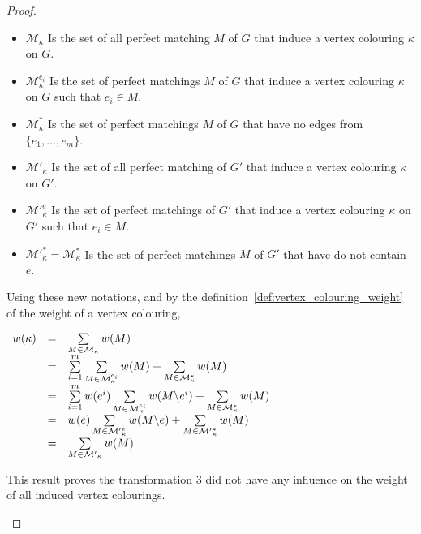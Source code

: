 \begin{proof}
\begin{enumerate}
            \begin{itemize}
                \item $\mathcal{M}_\kappa$ Is the set of all perfect matching $M$ of $G$ that induce a vertex colouring $\kappa$ on $G$.
                \item $\mathcal{M}_\kappa^{e_i}$ Is the set of perfect matchings $M$ of $G$ that induce a vertex colouring $\kappa$ on $G$ such that $e_i \in M$.
                \item $\mathcal{M}_\kappa^{*}$ Is the set of perfect matchings $M$ of $G$ that have no edges from $\{e_1, \dots, e_m\}$.
                \item $\mathcal{M'}_\kappa$ Is the set of all perfect matching of $G'$ that induce a vertex colouring $\kappa$ on $G'$.
                \item $\mathcal{M'}_\kappa^{e}$ Is the set of perfect matchings of $G'$ that induce a vertex colouring $\kappa$ on $G'$ such that $e_i \in M$.
                \item $\mathcal{M'}_\kappa^{*} = \mathcal{M}_\kappa^{*}$ Is the set of perfect matchings $M$ of $G'$ that have do not contain $e$.
            \end{itemize}

            Using these new notations, and by the definition~\ref{def:vertex_colouring_weight} of the weight of a vertex colouring,

            \begin{center}
                $\begin{array}{r c l}
                    w(\kappa) & = & \sum\limits_{M \in \mathcal{M}_\kappa} w(M)  \\
                              & = & \sum\limits_{i = 1}^m \sum\limits_{M \in \mathcal{M}_\kappa^{e_i}} w(M) + \sum\limits_{M \in \mathcal{M}_\kappa^{*}} w(M) \\
                              & = & \sum\limits_{i = 1}^m w(e^i) \sum\limits_{M \in \mathcal{M}_\kappa^{e_i}} w(M \backslash e^i) + \sum\limits_{M \in \mathcal{M}_\kappa^{*}} w(M) \\
                              & = & w(e) \sum\limits_{M \in \mathcal{M'}_\kappa^{e}} w(M \backslash e) + \sum\limits_{M \in \mathcal{M'}_\kappa^{*}} w(M) \\
                              & = & \sum\limits_{M \in \mathcal{M'}_\kappa} w(M)
                \end{array}$
            \end{center}

            This result proves the transformation 3 did not have any influence on the weight of all induced vertex colourings.
    \end{enumerate}
\end{proof}

